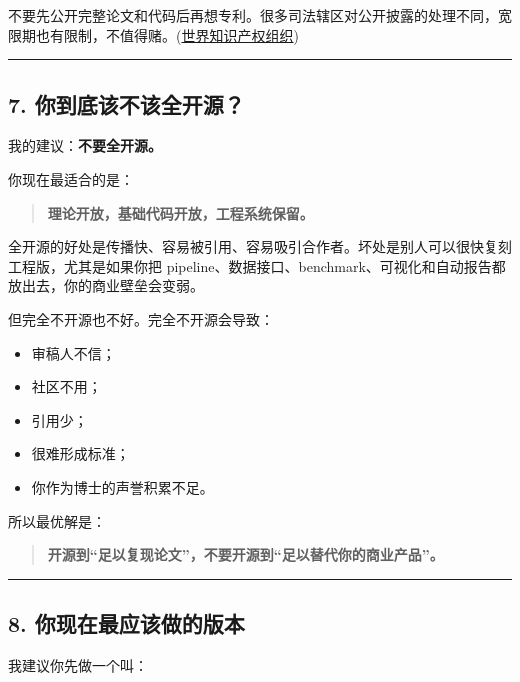 \documentclass[
  12pt,
]{ctexart}
\providecommand{\tightlist}{%
  \setlength{\itemsep}{0pt}\setlength{\parskip}{0pt}}
\begin{document}
不要先公开完整论文和代码后再想专利。很多司法辖区对公开披露的处理不同，宽限期也有限制，不值得赌。(\href{https://www.wipo.int/en/web/patents/faq_patents?utm_source=chatgpt.com}{世界知识产权组织})

\begin{center}\rule{0.5\linewidth}{0.5pt}\end{center}

\subsection{7.
你到底该不该全开源？}\label{ux4f60ux5230ux5e95ux8be5ux4e0dux8be5ux5168ux5f00ux6e90}

我的建议：\textbf{不要全开源。}

你现在最适合的是：

\begin{quote}
\textbf{理论开放，基础代码开放，工程系统保留。}
\end{quote}

全开源的好处是传播快、容易被引用、容易吸引合作者。坏处是别人可以很快复刻工程版，尤其是如果你把
pipeline、数据接口、benchmark、可视化和自动报告都放出去，你的商业壁垒会变弱。

但完全不开源也不好。完全不开源会导致：

\begin{itemize}
\tightlist
\item
  审稿人不信；
\item
  社区不用；
\item
  引用少；
\item
  很难形成标准；
\item
  你作为博士的声誉积累不足。
\end{itemize}

所以最优解是：

\begin{quote}
\textbf{开源到``足以复现论文''，不要开源到``足以替代你的商业产品''。}
\end{quote}

\begin{center}\rule{0.5\linewidth}{0.5pt}\end{center}

\subsection{8.
你现在最应该做的版本}\label{ux4f60ux73b0ux5728ux6700ux5e94ux8be5ux505aux7684ux7248ux672c}

我建议你先做一个叫：
\end{document}
